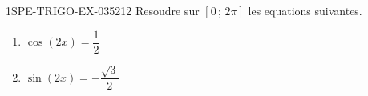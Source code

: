 \begin{exercice}{1SPE-TRIGO-EX-035}{2}{12}
Resoudre sur $[0\,;\,2\pi]$ les equations suivantes.
\begin{enumerate}
  \item $\cos(2x) = \dfrac{1}{2}$
  \item $\sin(2x) = -\dfrac{\sqrt{3}}{2}$
\end{enumerate}
\end{exercice}
